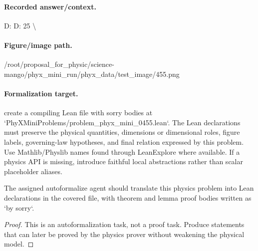\paragraph{Recorded answer/context.}
D: D: 25 \textbackslash{}

\paragraph{Figure/image path.}
/root/proposal\_for\_physic/science-mango/phyx\_mini\_run/phyx\_data/test\_image/455.png

\paragraph{Formalization target.}
create a compiling Lean file with sorry bodies at `PhyXMiniProblems/problem\_phyx\_mini\_0455.lean`. The Lean declarations must preserve the physical quantities, dimensions or dimensional roles, figure labels, governing-law hypotheses, and final relation expressed by this problem.
Use Mathlib/Physlib names found through LeanExplore where available. If a physics API is missing, introduce faithful local abstractions rather than scalar placeholder aliases.

\begin{theorem}
\label{thm:physics:phyx_mini_0455:target}
The assigned autoformalize agent should translate this physics problem into Lean declarations in the covered file, with theorem and lemma proof bodies written as `by sorry`.
\end{theorem}
\begin{proof}
This is an autoformalization task, not a proof task. Produce statements that can later be proved by the physics prover without weakening the physical model.
\end{proof}

